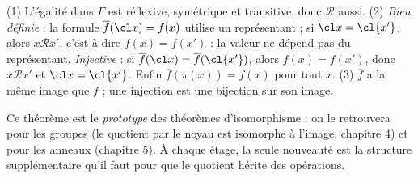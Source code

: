 \begin{preuve}
(1) L'égalité dans $F$ est réflexive, symétrique et transitive, donc $\mathcal R$ aussi.
(2) \emph{Bien définie} : la formule $\overline f(\cl x)=f(x)$ utilise un représentant ; si $\cl x=\cl{x'}$, alors $x\mathcal R x'$, c'est-à-dire $f(x)=f(x')$ : la valeur ne dépend pas du représentant. \emph{Injective} : si $\overline f(\cl x)=\overline f(\cl{x'})$, alors $f(x)=f(x')$, donc $x\mathcal R x'$ et $\cl x=\cl{x'}$. Enfin $\overline f(\pi(x))=f(x)$ pour tout $x$.
(3) $\overline f$ a la même image que $f$ ; une injection est une bijection sur son image.
\end{preuve}
\begin{essentiel}
Ce théorème est le \emph{prototype} des théorèmes d'isomorphisme : on le retrouvera pour les groupes (le quotient par le noyau est isomorphe à l'image, chapitre 4) et pour les anneaux (chapitre 5). À chaque étage, la seule nouveauté est la structure supplémentaire qu'il faut pour que le quotient hérite des opérations.
\end{essentiel}

